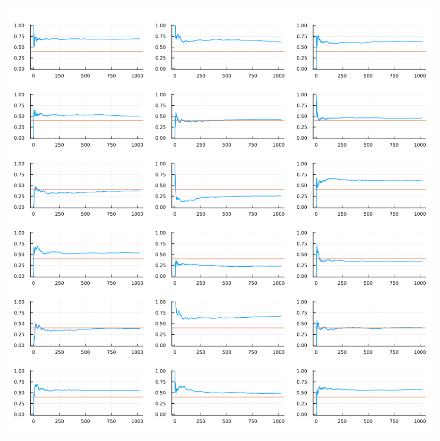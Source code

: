 \documentclass[
  letterpaper,
  DIV=11,
  numbers=noendperiod]{scrartcl}
\begin{document}
\begin{figure}[H]

{\centering \includegraphics{05 Central limit theorem_files/figure-pdf/cell-20-output-1.png}

}

\end{figure}
\end{document}
